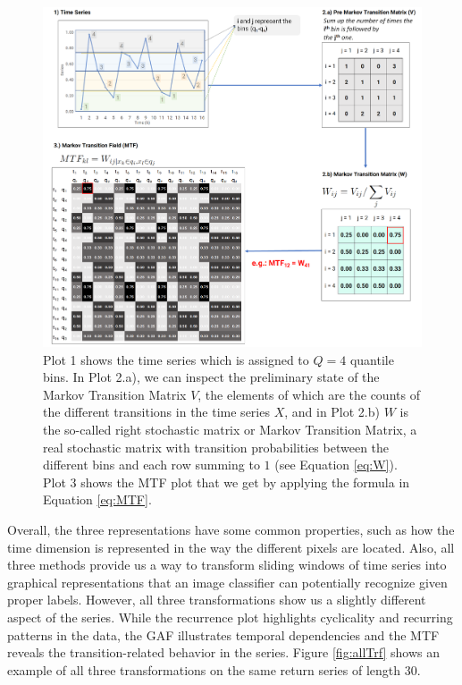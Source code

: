 \documentclass[11pt, a4paper]{article}
\begin{document}
\begin{figure}[H]
    \centering
    \includegraphics[width=\textwidth]{images/MTF.png}
    \caption{Plot 1 shows the time series which is assigned to $Q=4$ quantile bins. In Plot 2.a), we can inspect the preliminary state of the Markov Transition Matrix $V$, the elements of which are the counts of the different transitions in the time series $X$, and in Plot 2.b) $W$ is the so-called right stochastic matrix or Markov Transition Matrix, a real stochastic matrix with transition probabilities between the different bins and each row summing to $1$ (see Equation \ref{eq:W}). Plot 3 shows the MTF plot that we get by applying the formula in Equation \ref{eq:MTF}.}
    \label{fig:MTF}
\end{figure}

Overall, the three representations have some common properties, such as how the time dimension is represented in the way the different pixels are located. Also, all three methods provide us a way to transform sliding windows of time series into graphical representations that an image classifier can potentially recognize given proper labels. However, all three transformations show us a slightly different aspect of the series. While the recurrence plot highlights cyclicality and recurring patterns in the data, the GAF illustrates temporal dependencies and the MTF reveals the transition-related behavior in the series. Figure \ref{fig:allTrf} shows an example of all three transformations on the same return series of length $30$.
\end{document}
